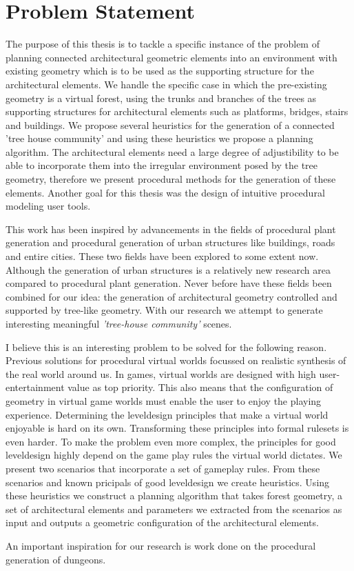 \chapter{Problem Statement}
\label{sec:problem}


The purpose of this thesis is to tackle a specific instance of the problem of planning connected architectural geometric elements into an environment with existing geometry which is to be used as the supporting structure for the architectural elements. We handle the specific case in which the pre-existing geometry is a virtual forest, using the trunks and branches of the trees as supporting structures for architectural elements such as platforms, bridges, stairs and buildings. We propose several heuristics for the generation of a connected 'tree house community' and using these heuristics we propose a planning algorithm. The architectural elements need a large degree of adjustibility to be able to incorporate them into the irregular environment posed by the tree geometry, therefore we present procedural methods for the generation of these elements. Another goal for this thesis was the design of intuitive procedural modeling user tools.      

This work has been inspired by advancements in the fields of procedural plant generation and procedural generation of urban structures like buildings, roads and entire cities. These two fields have been explored to some extent now. Although the generation of urban structures is a relatively new research area compared to procedural plant generation. Never before have these fields been combined for our idea: the generation of architectural geometry controlled and supported by tree-like geometry. With our research we attempt to 
generate interesting meaningful \emph{'tree-house community'} scenes.

I believe this is an interesting problem to be solved for the following reason. Previous solutions for procedural virtual worlds focussed on realistic synthesis of the real world around us. In games, virtual worlds are designed with high user-entertainment value as top priority. This also means that the configuration of geometry in virtual game worlds must enable the user to enjoy the playing experience. Determining the leveldesign principles that make a virtual world enjoyable is hard on its own. Transforming these principles into formal rulesets is even harder. To make the problem even more complex, the principles for good leveldesign highly depend on the game play rules the virtual world dictates. We present two scenarios that incorporate a set of gameplay rules. From these scenarios and known pricipals of good leveldesign we create heuristics. Using these heuristics we construct a planning algorithm that takes forest geometry, a set of architectural elements and parameters we extracted from the scenarios as input and outputs a geometric configuration of the architectural elements.     

An important inspiration for our research is work done on the procedural generation of dungeons. 

